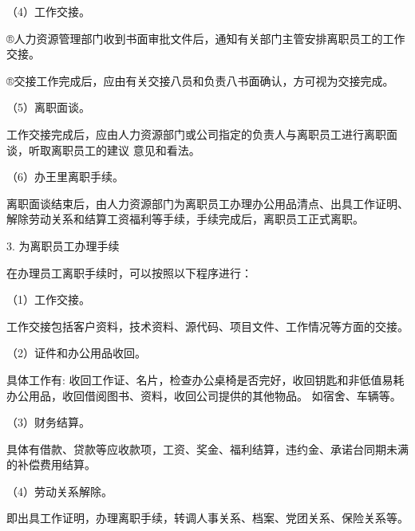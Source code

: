     （4）工作交接。

    ®人力资源管理部门收到书面审批文件后，通知有关部门主管安排离职员工的工作交接。

    ®交接工作完成后，应由有关交接八员和负责八书面确认，方可视为交接完成。

    （5）离职面谈。

    工作交接完成后，应由人力资源部门或公司指定的负责人与离职员工进行离职面谈，听取离职员工的建议 意见和看法。

    （6）办王里离职手续。

    离职面谈结束后，由人力资源部门为离职员工办理办公用品清点、出具工作证明、解除劳动关系和结算工资福利等手续，手续完成后，离职员工正式离职。

    3. 为离职员工办理手续

    在办理员工离职手续时，可以按照以下程序进行：

    （1）工作交接。

    工作交接包括客户资料，技术资料、源代码、项目文件、工作情况等方面的交接。

    （2）证件和办公用品收回。

    具体工作有: 收回工作证、名片，检查办公桌椅是否完好，收回钥匙和非低值易耗办公用品，收回借阅图书、资料，收回公司提供的其他物品。 如宿舍、车辆等。

    （3）财务结算。

    具体有借款、贷款等应收款项，工资、奖金、福利结算，违约金、承诺台同期未满的补偿费用结算。

    （4）劳动关系解除。

    即出具工作证明，办理离职手续，转调人事关系、档案、党团关系、保险关系等。
